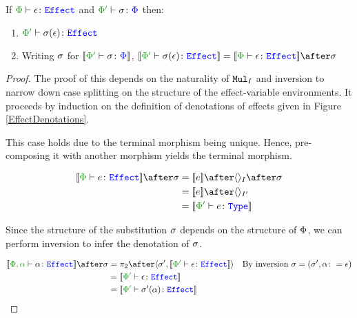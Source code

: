 \documentclass{Report}
\begin{document}
\begin{framed}
    \begin{theorem}\label{EffectSubstitutionOnEffects} 
        If $\wellformedeffect{\P}{\e}$ and $\typerelation{\P'}{\si}{\P}$ then: 
        \begin{enumerate}[label=\roman*.]
            \item $\wellformedeffect{\P'}{\si(\e)}$
            \item Writing $\si$ for $\deno{\typerelation{\P'}{\si}{\P}}$,  $\deno{\wellformedeffect{\P'}{\si(\e)}} = \deno{\wellformedeffect{\P}{\e}}\after\si$
        \end{enumerate}
          
    \end{theorem}
    
    \begin{proof}
        The proof of this depends on the naturality of $\Mul_I$ and inversion to narrow down case splitting on the structure of the effect-variable environments. It proceeds by induction on the definition of denotations of effects given in Figure \ref{EffectDenotations}.
    
        \case{\eground}
        This case holds due to the terminal morphism being unique. Hence, pre-composing it with another morphism yields the terminal morphism.
    
        \begin{align*}
            \deno{\typerelation{\P}{e}{\effect}}\after\si & = \deno{e}\after\term{I}\after\si \\
            & = \deno{e}\after\term{I'} \\
            & = \deno{\typerelation{\P'}{e}{\type}}\\
        \end{align*}
    
    \case{\evar}
    
    Since the structure of the substitution $\si$ depends on the structure of $\P$, we can perform inversion to infer the denotation of $\si$.
    
    \begin{align*}
        \deno{\typerelation{\P,\a}{\a}{\effect}}\after\si &= \pp\after\pr{\si'}{\deno{\typerelation{\P'}{\e}{\effect}}}\qt{By inversion $\si = (\si', \a\setto\e)$}\\
        & =\deno{\typerelation{\P'}{\e}{\effect}} \\
        &= \deno{\typerelation{\P'}{\si'(\a)}{\effect}}\\
    \end{align*}
    

\end{proof}
\end{framed}
\end{document}
